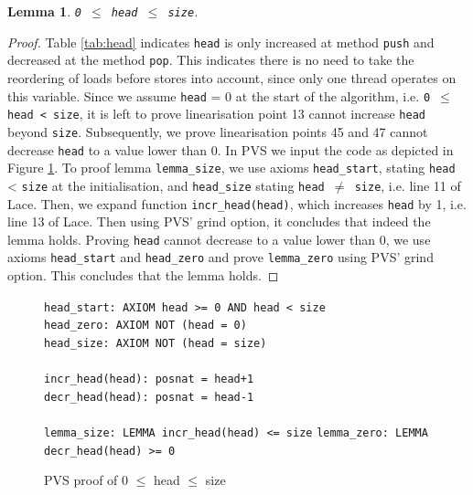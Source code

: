 \documentclass{sig-alternate-br}
\newtheorem{lemma}{Lemma}
\begin{document}
\begin{lemma}
	\texttt{0 $\leq$ head $\leq$ size}.
	\label{lem:headsize}
\end{lemma}
\begin{proof}
	Table \ref{tab:head} indicates \texttt{head} is only increased at method \texttt{push} and decreased at the method \texttt{pop}.
	This indicates there is no need to take the reordering of loads before stores into account, since only one thread operates on this variable.
	Since we assume \texttt{head} = 0 at the start of the algorithm, i.e. \texttt{0 $\leq$ head < size}, it is left to prove linearisation point 13 cannot increase \texttt{head} beyond \texttt{size}.
	Subsequently, we prove linearisation points 45 and 47 cannot decrease \texttt{head} to a value lower than 0.
	In PVS we input the code as depicted in Figure \ref{pvs:head}.
	To proof lemma \texttt{lemma\_size}, we use axioms \texttt{head\_start}, stating \texttt{head} < \texttt{size} at the initialisation, and \texttt{head\_size} stating \texttt{head $\neq$ size}, i.e. line 11 of Lace.
	Then, we expand function \texttt{incr\_head(head)}, which increases \texttt{head} by 1, i.e. line 13 of Lace.
	Then using PVS' grind option, it concludes that indeed the lemma holds.
	Proving \texttt{head} cannot decrease to a value lower than 0, we use axioms \texttt{head\_start} and \texttt{head\_zero} and prove \texttt{lemma\_zero} using PVS' grind option.
	This concludes that the lemma holds.
\end{proof}
\begin{figure}[h]
	\texttt{head\_start: AXIOM head >= 0 AND head < size}\\
	\texttt{head\_zero:  AXIOM NOT (head = 0)}\\
	\texttt{head\_size:  AXIOM NOT (head = size)}\\\\
	\texttt{incr\_head(head): posnat = head+1}\\
	\texttt{decr\_head(head): posnat = head-1}\\\\
	\texttt{lemma\_size: LEMMA incr\_head(head) <= size}
	\texttt{lemma\_zero: LEMMA decr\_head(head) >= 0}
	\caption{PVS proof of 0 $\leq$ head $\leq$ size}
	\label{pvs:head}
\end{figure}
\end{document}

